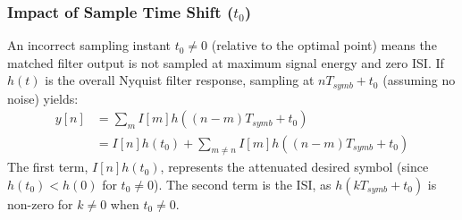 \subsubsection{Impact of Sample Time Shift ($t_0$)} %
An incorrect sampling instant $t_0 \neq 0$ (relative to the optimal point) means the matched filter output is not sampled at maximum signal energy and zero ISI. If $h(t)$ is the overall Nyquist filter response, sampling at $nT_{symb} + t_0$ (assuming no noise) yields:
\begin{align}
	y[n] &= \sum_m I[m]h((n-m)T_{symb} + t_0) \\
	&= I[n]h(t_0) + \sum_{m \neq n} I[m]h((n-m)T_{symb} + t_0)
\end{align}
The first term, $I[n]h(t_0)$, represents the attenuated desired symbol (since $h(t_0) < h(0)$ for $t_0 \neq 0$). The second term is the ISI, as $h(kT_{symb} + t_0)$ is non-zero for $k \neq 0$ when $t_0 \neq 0$.

